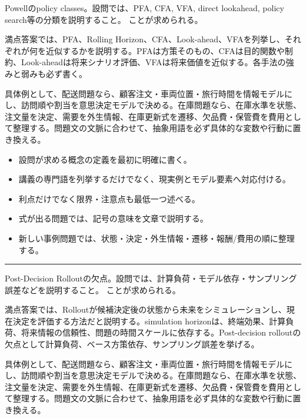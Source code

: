 \clearpage{}
Powellのpolicy classes。設問では、PFA, CFA, VFA, direct lookahead, policy search等の分類を説明すること。 ことが求められる。\par
{}
満点答案では、PFA、Rolling Horizon、CFA、Look-ahead、VFAを列挙し、それぞれが何を近似するかを説明する。PFAは方策そのもの、CFAは目的関数や制約、Look-aheadは将来シナリオ評価、VFAは将来価値を近似する。各手法の強みと弱みも必ず書く。\par
{}
具体例として、配送問題なら、顧客注文・車両位置・旅行時間を情報モデルにし、訪問順や割当を意思決定モデルで決める。在庫問題なら、在庫水準を状態、注文量を決定、需要を外生情報、在庫更新式を遷移、欠品費・保管費を費用として整理する。問題文の文脈に合わせて、抽象用語を必ず具体的な変数や行動に置き換える。\par
{}
\begin{itemize}
\item 設問が求める概念の定義を最初に明確に書く。
\item 講義の専門語を列挙するだけでなく、現実例とモデル要素へ対応付ける。
\item 利点だけでなく限界・注意点も最低一つ述べる。
\item 式が出る問題では、記号の意味を文章で説明する。
\item 新しい事例問題では、状態・決定・外生情報・遷移・報酬/費用の順に整理する。
\end{itemize}
\vspace{2mm}\hrule\vspace{2mm}
Post-Decision Rolloutの欠点。設問では、計算負荷・モデル依存・サンプリング誤差などを説明すること。 ことが求められる。\par
{}
満点答案では、Rolloutが候補決定後の状態から未来をシミュレーションし、現在決定を評価する方法だと説明する。simulation horizonは、終端効果、計算負荷、将来情報の信頼性、問題の時間スケールに依存する。Post-decision rolloutの欠点として計算負荷、ベース方策依存、サンプリング誤差を挙げる。\par
{}
具体例として、配送問題なら、顧客注文・車両位置・旅行時間を情報モデルにし、訪問順や割当を意思決定モデルで決める。在庫問題なら、在庫水準を状態、注文量を決定、需要を外生情報、在庫更新式を遷移、欠品費・保管費を費用として整理する。問題文の文脈に合わせて、抽象用語を必ず具体的な変数や行動に置き換える。\par
